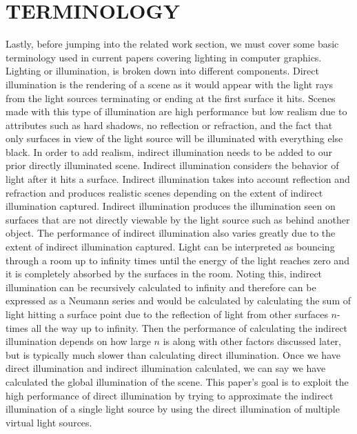 \section{TERMINOLOGY}
Lastly, before jumping into the related work section, we must cover some basic terminology used in current papers covering lighting in computer graphics.  Lighting or illumination, is broken down into different components.  Direct illumination is the rendering of a scene as it would appear with the light rays from the light sources terminating or ending at the first surface it hits.  Scenes made with this type of illumination are high performance but low realism due to attributes such as hard shadows, no reflection or refraction, and the fact that only surfaces in view of the light source will be illuminated with everything else black.  In order to add realism, indirect illumination needs to be added to our prior directly illuminated scene.  Indirect illumination considers the behavior of light after it hits a surface.  Indirect illumination takes into account reflection and refraction and produces realistic scenes depending on the extent of indirect illumination captured.  Indirect illumination produces the illumination seen on surfaces that are not directly viewable by the light source such as behind another object.  The performance of indirect illumination also varies greatly due to the extent of indirect illumination captured.  Light can be interpreted as bouncing through a room up to infinity times until the energy of the light reaches zero and it is completely absorbed by the surfaces in the room.  Noting this, indirect illumination can be recursively calculated to infinity and therefore can be expressed as a Neumann series and would be calculated by calculating the sum of light hitting a surface point due to the reflection of light from other surfaces $n$-times all the way up to infinity.  Then the performance of calculating the indirect illumination depends on how large $n$ is along with other factors discussed later, but is typically much slower than calculating direct illumination.  Once we have direct illumination and indirect illumination calculated, we can say we have calculated the global illumination of the scene.  This paper's goal is to exploit the high performance of direct illumination by trying to approximate the indirect illumination of a single light source by using the direct illumination of multiple virtual light sources.
